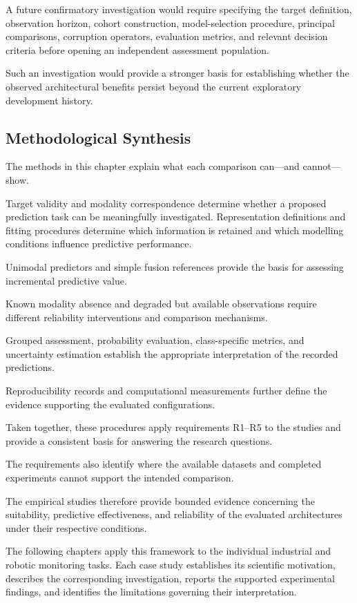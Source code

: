 A future confirmatory investigation would require specifying the target definition, observation horizon, cohort construction, model-selection procedure, principal comparisons, corruption operators, evaluation metrics, and relevant decision criteria before opening an independent assessment population.

Such an investigation would provide a stronger basis for establishing whether the observed architectural benefits persist beyond the current exploratory development history.

\subsection{Methodological Synthesis}

The methods in this chapter explain what each comparison can—and cannot—show.

Target validity and modality correspondence determine whether a proposed prediction task can be meaningfully investigated. Representation definitions and fitting procedures determine which information is retained and which modelling conditions influence predictive performance.

Unimodal predictors and simple fusion references provide the basis for assessing incremental predictive value.

Known modality absence and degraded but available observations require different reliability interventions and comparison mechanisms.

Grouped assessment, probability evaluation, class-specific metrics, and uncertainty estimation establish the appropriate interpretation of the recorded predictions.

Reproducibility records and computational measurements further define the evidence supporting the evaluated configurations.

Taken together, these procedures apply requirements R1–R5 to the studies and provide a consistent basis for answering the research questions.

The requirements also identify where the available datasets and completed experiments cannot support the intended comparison.

The empirical studies therefore provide bounded evidence concerning the suitability, predictive effectiveness, and reliability of the evaluated architectures under their respective conditions.

The following chapters apply this framework to the individual industrial and robotic monitoring tasks. Each case study establishes its scientific motivation, describes the corresponding investigation, reports the supported experimental findings, and identifies the limitations governing their interpretation.
